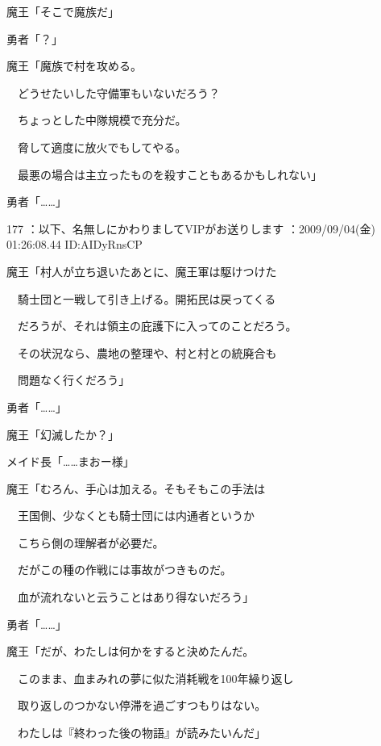 \documentclass[a4j,twocolumn]{tarticle}
\begin{document}
魔王「そこで魔族だ」\par{} 
勇者「？」 



魔王「魔族で村を攻める。\par{} 
　どうせたいした守備軍もいないだろう？\par{} 
　ちょっとした中隊規模で充分だ。\par{} 
　脅して適度に放火でもしてやる。\par{} 
　最悪の場合は主立ったものを殺すこともあるかもしれない」 



勇者「……」 

	
    
    

177 ：以下、名無しにかわりましてVIPがお送りします ：2009/09/04(金) 01:26:08.44 ID:AIDyRnsCP 


魔王「村人が立ち退いたあとに、魔王軍は駆けつけた\par{} 
　騎士団と一戦して引き上げる。開拓民は戻ってくる \par{}
　だろうが、それは領主の庇護下に入ってのことだろう。\par{} 
　その状況なら、農地の整理や、村と村との統廃合も \par{}
　問題なく行くだろう」 



勇者「……」 



魔王「幻滅したか？」 



メイド長「……まおー様」 



魔王「むろん、手心は加える。そもそもこの手法は\par{} 
　王国側、少なくとも騎士団には内通者というか\par{} 
　こちら側の理解者が必要だ。\par{} 
　だがこの種の作戦には事故がつきものだ。\par{} 
　血が流れないと云うことはあり得ないだろう」 



勇者「……」 



魔王「だが、わたしは何かをすると決めたんだ。\par{} 
　このまま、血まみれの夢に似た消耗戦を100年繰り返し\par{}
　取り返しのつかない停滞を過ごすつもりはない。\par{} 
　わたしは『終わった後の物語』が読みたいんだ」 
\end{document}
